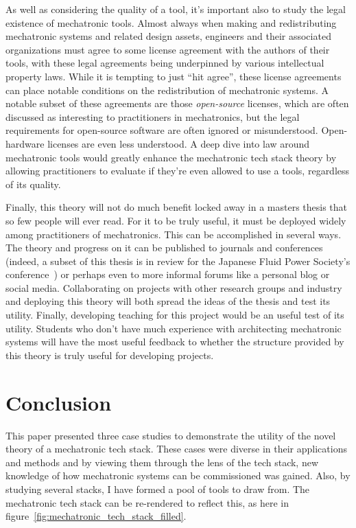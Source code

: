 \documentclass[english,12pt,a4paper,pdftex,eng,utf8]{aaltothesis}
\begin{document}
As well as considering the quality of a tool, it's important also to study the legal existence of mechatronic tools.  Almost always when making and redistributing mechatronic systems and related design assets, engineers and their associated organizations must agree to some license agreement with the authors of their tools, with these legal agreements being underpinned by various intellectual property laws.  While it is tempting to just ``hit agree'', these license agreements can place notable conditions on the redistribution of mechatronic systems.  A notable subset of these agreements are those \textit{open-source} licenses, which are often discussed as interesting to practitioners in mechatronics, but the legal requirements for open-source software are often ignored or misunderstood.  Open-hardware licenses are even less understood.  A deep dive into law around mechatronic tools would greatly enhance the mechatronic tech stack theory by allowing practitioners to evaluate if they're even allowed to use a tools, regardless of its quality.

Finally, this theory will not do much benefit locked away in a masters thesis that so few people will ever read.  For it to be truly useful, it must be deployed widely among practitioners of mechatronics.  This can be accomplished in several ways.  The theory and progress on it can be published to journals and conferences (indeed, a subset of this thesis is in review for the Japanese Fluid Power Society's conference~\cite{Porter2024}) or perhaps even to more informal forums like a personal blog or social media.  Collaborating on projects with other research groups and industry and deploying this theory will both spread the ideas of the thesis and test its utility.  Finally, developing teaching for this project would be an useful test of its utility.  Students who don't have much experience with architecting mechatronic systems will have the most useful feedback to whether the structure provided by this theory is truly useful for developing projects.

\clearpage


\section{Conclusion}

This paper presented three case studies to demonstrate the utility of the novel theory of a mechatronic tech stack. These cases were diverse in their applications and methods and by viewing them through the lens of the tech stack, new knowledge of how mechatronic systems can be commissioned was gained. Also, by studying several stacks, I have formed a pool of tools to draw from. The mechatronic tech stack can be re-rendered to reflect this, as here in figure~\ref{fig:mechatronic_tech_stack_filled}.
\end{document}
